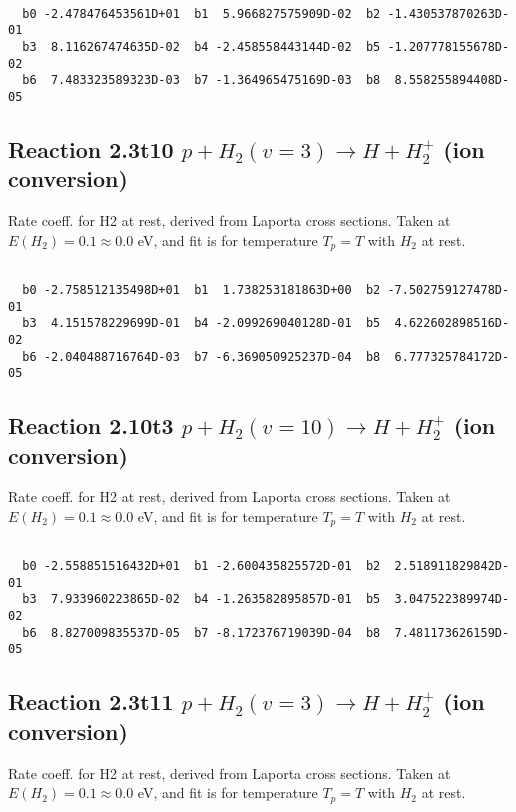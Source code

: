 \begin{small}\begin{verbatim}

  b0 -2.478476453561D+01  b1  5.966827575909D-02  b2 -1.430537870263D-01
  b3  8.116267474635D-02  b4 -2.458558443144D-02  b5 -1.207778155678D-02
  b6  7.483323589323D-03  b7 -1.364965475169D-03  b8  8.558255894408D-05

\end{verbatim}\end{small}

\newpage
\subsection{
Reaction 2.3t10
$ p + H_2(v=3) \rightarrow H + H_2^+$ (ion conversion)
}
Rate coeff. for H2 at rest, derived from Laporta cross sections.
Taken at $E(H_2) = 0.1 \approx 0.0$ eV,  and fit is for temperature $T_p=T$ with $H_2$ at rest.

\begin{small}\begin{verbatim}

  b0 -2.758512135498D+01  b1  1.738253181863D+00  b2 -7.502759127478D-01
  b3  4.151578229699D-01  b4 -2.099269040128D-01  b5  4.622602898516D-02
  b6 -2.040488716764D-03  b7 -6.369050925237D-04  b8  6.777325784172D-05

\end{verbatim}\end{small}

\newpage
\subsection{
Reaction 2.10t3
$ p + H_2(v=10) \rightarrow H + H_2^+$ (ion conversion)
}
Rate coeff. for H2 at rest, derived from Laporta cross sections.
Taken at $E(H_2) = 0.1 \approx 0.0$ eV,  and fit is for temperature $T_p=T$ with $H_2$ at rest.

\begin{small}\begin{verbatim}

  b0 -2.558851516432D+01  b1 -2.600435825572D-01  b2  2.518911829842D-01
  b3  7.933960223865D-02  b4 -1.263582895857D-01  b5  3.047522389974D-02
  b6  8.827009835537D-05  b7 -8.172376719039D-04  b8  7.481173626159D-05

\end{verbatim}\end{small}

\newpage
\subsection{
Reaction 2.3t11
$ p + H_2(v=3) \rightarrow H + H_2^+$ (ion conversion)
}
Rate coeff. for H2 at rest, derived from Laporta cross sections.
Taken at $E(H_2) = 0.1 \approx 0.0$ eV,  and fit is for temperature $T_p=T$ with $H_2$ at rest.

